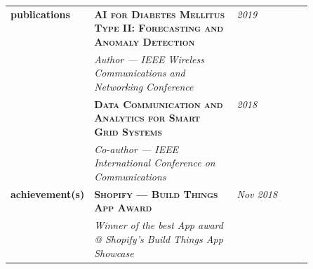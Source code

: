 \documentclass{article}
\begin{document}
\begin{longtable}{@{}>{\raggedleft}p{0.25\linewidth}
                          p{}>{}p{0.25\linewidth}@{}}
        \textbf{publications}
            & \textbf{\textsc{AI for Diabetes Mellitus Type II: Forecasting and Anomaly Detection}} & \textit{2019}\\
            & \textit{Author --- IEEE Wireless Communications and Networking Conference}  \\ [1em]

            & \textbf{\textsc{Data Communication and Analytics for Smart Grid Systems}} & \textit{2018}\\
            & \textit{Co-author --- IEEE International Conference on Communications}\\ [1em]

        \textbf{achievement(s)}
            & \textbf{\textsc{Shopify --- Build Things App Award}} & \textit{Nov 2018} \\
            & \textit{Winner of the best App award @ Shopify's Build Things App Showcase} \\ [1em]

  \end{longtable}
\end{document}
